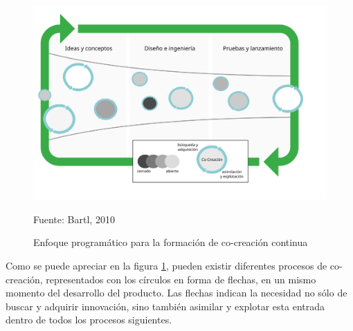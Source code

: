 \begin{figure}[!h]
	\caption{Enfoque programático para la formación de co-creación continua}
	\centering \includegraphics[width=140mm]{capitulos/graficos/cocreacionInnovacionBartl}
	\label{fig:cocreacionInnovacionBartl}

		\footnotesize
		Fuente: Bartl, 2010
\end{figure}

Como se puede apreciar en la figura \ref{fig:cocreacionInnovacionBartl}, pueden existir diferentes procesos de co-creación, representados con los círculos en forma de flechas, en un mismo momento del desarrollo del producto. Las flechas indican la necesidad no sólo de buscar y adquirir innovación, sino también asimilar y explotar esta entrada dentro de todos los procesos siguientes.

